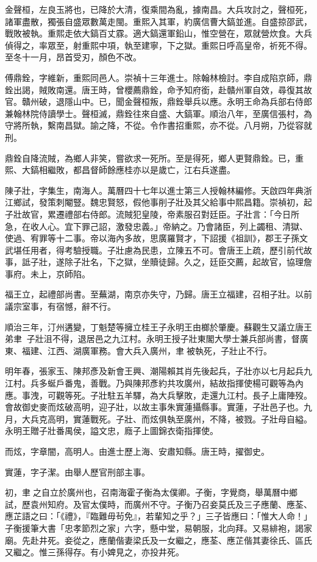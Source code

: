 \begin{pinyinscope}
金聲桓，左良玉將也，已降於大清，復乘間為亂，據南昌。大兵攻討之，聲桓死，諸軍盡散，獨張自盛眾數萬走閩。重熙入其軍，約廣信曹大鎬並進。自盛掠邵武，戰敗被執。重熙走依大鎬百丈霡。適大鎬還軍鉛山，惟空營在，眾就營炊食。大兵偵得之，率眾至，射重熙中項，執至建寧，下之獄。重熙日呼高皇帝，祈死不得。至冬十一月，昂首受刃，顏色不改。

傅鼎銓，字維新，重熙同邑人。崇禎十三年進士。除翰林檢討。李自成陷京師，鼎銓出謁，賊敗南還。唐王時，曾櫻薦鼎銓，命予知府銜，赴贛州軍自效，尋復其故官。贛州破，退隱山中。已，聞金聲桓叛，鼎銓舉兵以應。永明王命為兵部右侍郎兼翰林院侍讀學士。聲桓滅，鼎銓往來自盛、大鎬軍。順治八年，至廣信張村，為守將所執，繫南昌獄。諭之降，不從。令作書招重熙，亦不從。八月朔，乃從容就刑。

鼎銓自降流賊，為鄉人非笑，嘗欲求一死所。至是得死，鄉人更賢鼎銓。已，重熙、大鎬相繼敗，都昌督師餘應桂亦以是歲亡，江右兵遂盡。

陳子壯，字集生，南海人。萬曆四十七年以進士第三人授翰林編修。天啟四年典浙江鄉試，發策刺閹豎。魏忠賢怒，假他事削子壯及其父給事中熙昌籍。崇禎初，起子壯故官，累遷禮部右侍郎。流賊犯皇陵，帝素服召對廷臣。子壯言：「今日所急，在收人心。宜下罪己詔，激發忠義。」帝納之。乃會諸臣，列上蠲租、清獄、使過、宥罪等十二事。帝以海內多故，思廣羅賢才，下詔援《祖訓》，郡王子孫文武堪任用者，得考驗授職。子壯慮為民患，立陳五不可。會唐王上疏，歷引前代故事，詆子壯，遂除子壯名，下之獄，坐贖徒歸。久之，廷臣交薦，起故官，協理詹事府。未上，京師陷。

福王立，起禮部尚書。至蕪湖，南京亦失守，乃歸。唐王立福建，召相子壯。以前議宗室事，有宿憾，辭不行。

順治三年，汀州遘變，丁魁楚等擁立桂王子永明王由榔於肇慶。蘇觀生又議立唐王弟聿，子壯沮不得，退居邑之九江村。永明王授子壯東閣大學士兼兵部尚書，督廣東、福建、江西、湖廣軍務。會大兵入廣州，聿被執死，子壯止不行。

明年春，張家玉、陳邦彥及新會王興、潮陽賴其肖先後起兵，子壯亦以七月起兵九江村。兵多蜒戶番鬼，善戰。乃與陳邦彥約共攻廣州，結故指揮使楊可觀等為內應。事洩，可觀等死。子壯駐五羊驛，為大兵擊敗，走還九江村。長子上庸陣歿。會故御史麥而炫破高明，迎子壯，以故主事朱實蓮攝縣事。實蓮，子壯邑子也。九月，大兵克高明，實蓮戰死。子壯、而炫俱執至廣州，不降，被戮。子壯母自縊。永明王贈子壯番禺侯，謚文忠，廕子上圖錦衣衛指揮使。

而炫，字章闇，高明人。由進士歷上海、安肅知縣。唐王時，擢御史。

實蓮，字子潔。由舉人歷官刑部主事。

初，聿之自立於廣州也，召南海霍子衡為太僕卿。子衡，字覺商，舉萬曆中鄉試，歷袁州知府。及官太僕時，而廣州不守。子衡乃召妾莫氏及三子應蘭、應荃、應芷語之曰：「《禮》，『臨難毋茍免』，若輩知之乎？」三子皆應曰：「惟大人命！」子衡援筆大書「忠孝節烈之家」六字，懸中堂，易朝服，北向拜。又易緋袍，謁家廟。先赴井死。妾從之，應蘭偕妻梁氏及一女繼之，應荃、應芷偕其妻徐氏、區氏又繼之。惟三孫得存。有小婢見之，亦投井死。


\end{pinyinscope}
